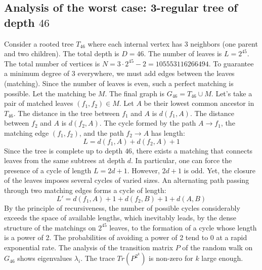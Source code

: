 \documentclass[12pt,a4paper]{article}
\begin{document}
\subsection{Analysis of the worst case: 3-regular tree of depth $46$}
Consider a rooted tree $T_{46}$ where each internal vertex has 3 neighbors (one parent and two children).
The total depth is $D = 46$.
The number of leaves is $L = 2^{45}$.
The total number of vertices is $N = 3 \cdot 2^{45} - 2 = 105553116266494$.
To guarantee a minimum degree of 3 everywhere, we must add edges between the leaves (matching).
Since the number of leaves is even, such a perfect matching is possible.
Let the matching be $M$. The final graph is $G_{46} = T_{46} \cup M$.
Let's take a pair of matched leaves $(f_1, f_2) \in M$.
Let $A$ be their lowest common ancestor in $T_{46}$.
The distance in the tree between $f_1$ and $A$ is $d(f_1, A)$.
The distance between $f_2$ and $A$ is $d(f_2, A)$.
The cycle formed by the path $A \to f_1$, the matching edge $(f_1, f_2)$, and the path $f_2 \to A$ has length:
$$ L = d(f_1, A) + d(f_2, A) + 1 $$
Since the tree is complete up to depth $46$, there exists a matching that connects leaves from the same subtrees at depth $d$.
In particular, one can force the presence of a cycle of length $L = 2d + 1$. However, $2d+1$ is odd.
Yet, the closure of the leaves imposes several cycles of varied sizes. An alternating path passing through two matching edges forms a cycle of length:
$$ L' = d(f_1, A) + 1 + d(f_2, B) + 1 + d(A, B) $$
By the principle of recursiveness, the number of possible cycles considerably exceeds the space of available lengths, which inevitably leads, by the dense structure of the matchings on $2^{45}$ leaves, to the formation of a cycle whose length is a power of 2. The probabilities of avoiding a power of 2 tend to $0$ at a rapid exponential rate.
The analysis of the transition matrix $P$ of the random walk on $G_{46}$ shows eigenvalues $\lambda_i$. The trace $Tr(P^{2^k})$ is non-zero for $k$ large enough.
\end{document}
